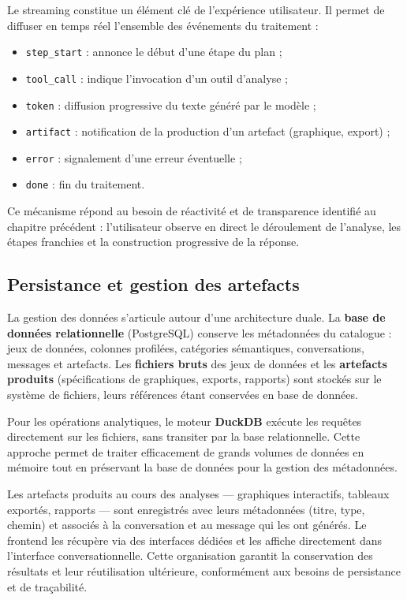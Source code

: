 Le streaming constitue un élément clé de l'expérience utilisateur. Il permet de diffuser en temps réel l'ensemble des événements du traitement :

\begin{itemize}
  \item \texttt{step\_start} : annonce le début d'une étape du plan ;
  \item \texttt{tool\_call} : indique l'invocation d'un outil d'analyse ;
  \item \texttt{token} : diffusion progressive du texte généré par le modèle ;
  \item \texttt{artifact} : notification de la production d'un artefact (graphique, export) ;
  \item \texttt{error} : signalement d'une erreur éventuelle ;
  \item \texttt{done} : fin du traitement.
\end{itemize}

Ce mécanisme répond au besoin de réactivité et de transparence identifié au chapitre précédent : l'utilisateur observe en direct le déroulement de l'analyse, les étapes franchies et la construction progressive de la réponse.

\subsection{Persistance et gestion des artefacts}

La gestion des données s'articule autour d'une architecture duale. La \textbf{base de données relationnelle} (PostgreSQL) conserve les métadonnées du catalogue : jeux de données, colonnes profilées, catégories sémantiques, conversations, messages et artefacts. Les \textbf{fichiers bruts} des jeux de données et les \textbf{artefacts produits} (spécifications de graphiques, exports, rapports) sont stockés sur le système de fichiers, leurs références étant conservées en base de données.

Pour les opérations analytiques, le moteur \textbf{DuckDB} exécute les requêtes directement sur les fichiers, sans transiter par la base relationnelle. Cette approche permet de traiter efficacement de grands volumes de données en mémoire tout en préservant la base de données pour la gestion des métadonnées.

Les artefacts produits au cours des analyses — graphiques interactifs, tableaux exportés, rapports — sont enregistrés avec leurs métadonnées (titre, type, chemin) et associés à la conversation et au message qui les ont générés. Le frontend les récupère via des interfaces dédiées et les affiche directement dans l'interface conversationnelle. Cette organisation garantit la conservation des résultats et leur réutilisation ultérieure, conformément aux besoins de persistance et de traçabilité.

